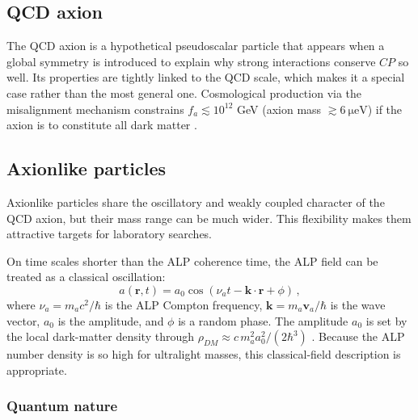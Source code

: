 \subsection{QCD axion}
The QCD axion is a hypothetical pseudoscalar particle that appears when a global symmetry is introduced to explain why strong interactions conserve $CP$ so well. Its properties are tightly linked to the QCD scale, which makes it a special case rather than the most general one. Cosmological production via the misalignment mechanism constrains $f_a \lesssim 10^{12}$ GeV (axion mass $\gtrsim \SI{6}{\micro\electronvolt}$) if the axion is to constitute all dark matter \cite{Preskill1983_invisible_axion,Abbott1982_Cosmological_Axion,Dine1983_not_so_harmless_axion}.

\subsection{Axionlike particles}\label{sec:intro:ALP}
Axionlike particles share the oscillatory and weakly coupled character of the QCD axion, but their mass range can be much wider. This flexibility makes them attractive targets for laboratory searches.

On time scales shorter than the ALP coherence time, the ALP field can be treated as a classical oscillation:
\begin{equation}
    a(\mathbf{r},t) = a_0\cos(\nu_a t - \mathbf{k}\cdot\mathbf{r} + \phi)
    \,,\label{eq:ALP_field}
\end{equation}
where $\nu_a = m_a c^2/\hbar$ is the ALP Compton frequency, $\mathbf{k} = m_a\mathbf{v}_a/\hbar$ is the wave vector, $a_0$ is the amplitude, and $\phi$ is a random phase. The amplitude $a_0$ is set by the local dark-matter density through \sout{$\rho_{DM} \approx c\,m_a^2 a_0^2/(2\hbar^3)$} \cite{Centers2021Stochastic}. Because the ALP number density is so high for ultralight masses, this classical-field description is appropriate.

\subsubsection{Quantum nature}


